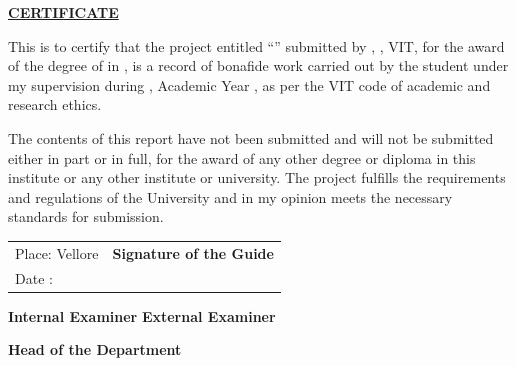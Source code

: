 \addtocounter{page}{-1}
\begin{center}
	\Large{\textbf{\underline{CERTIFICATE}}}	
\end{center}
\vspace{1em}
\normalsize
\begin{justify}
	\setlength{\parindent}{1cm}\indent This is to certify that the project entitled ``{\thesistitle}'' submitted by , {\schoolname}, VIT, for the award of the degree of {\programdegree} in {\programname}, is a record of bonafide work carried out by the student under my supervision during {\semester}, Academic Year {\academicyear}, as per the VIT code of academic and research ethics.
\end{justify}
\begin{justify}
	\setlength{\parindent}{1cm}\indent The contents of this report have not been submitted and will not be submitted either in part or in full, for the award of any other degree or diploma in this institute or any other institute or university. The project fulfills the requirements and regulations of the University and in my opinion meets the necessary standards for submission.
\end{justify}
\vspace{5cm}
\begin{tabular}[!h]{p{2cm}p{11cm}}
	\multicolumn{1}{l}{Place: Vellore} & \multicolumn{1}{r}{ \textbf{Signature of the Guide}} \\ [3ex]
	Date :          &  \\   
\end{tabular}
\vspace{4em}  \linebreak
\textbf{Internal Examiner} \hspace{7.0cm} \textbf{External Examiner} \linebreak
\vspace{4em}
\begin{center}
	\textbf{Head of the Department} 
\end{center}
